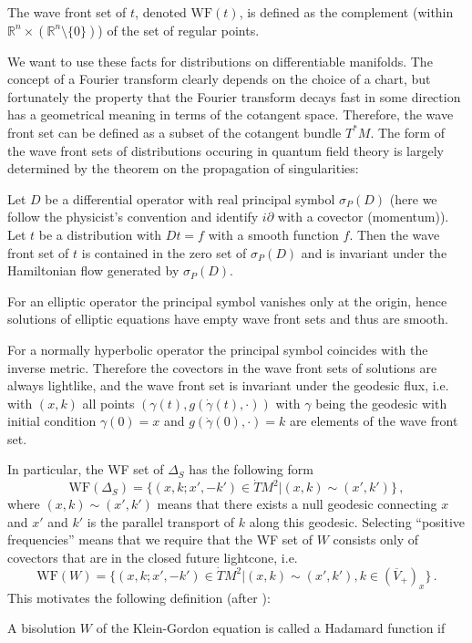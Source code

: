 \documentclass[12pt]{article}
\newcommand{\WF}{\mathrm{WF}}         %
\newcommand{\1}{\mathds{1}}                         %
\begin{document}
{{\begin{df}
The {wave front set} of $t$, denoted $\mathrm{WF}(t)$, is defined as the complement (within $\mathbb R^n\times(\mathbb R^n\setminus\{0\})$) of the set of regular points.
\end{df}}
We want to use these facts for distributions on differentiable manifolds. The concept of a Fourier transform clearly depends on the choice of a chart, but fortunately the property that  the Fourier transform decays fast  in some direction has a geometrical meaning in terms of the cotangent space. Therefore,
the wave front set can be defined as a subset of the cotangent bundle $T^*M$. The form of the wave front sets of distributions occuring in quantum field theory is largely determined by the theorem on the propagation of singularities:

{\begin{thm}
Let $D$ be a differential operator with real principal symbol $\sigma_P(D)$ (here we follow the physicist's convention and identify $i\partial$ with a covector (momentum)).
Let $t$ be a distribution with $Dt=f$ with a smooth function $f$. Then the wave front set of $t$ is contained in the zero set of $\sigma_P(D)$ and is invariant under the Hamiltonian flow generated by $\sigma_P(D)$.
\end{thm}}
\begin{itemize}
\item For an elliptic operator the principal symbol vanishes only at the origin, hence solutions of elliptic equations have empty wave front sets and thus are smooth.

{\item For a normally hyperbolic operator the principal symbol coincides with the inverse metric. Therefore the covectors in the wave front sets of solutions are always lightlike, and the wave front set is invariant under the geodesic flux, i.e. with $(x,k)$ all points $(\gamma(t),g(\dot\gamma(t),\cdot))$ with $\gamma$ being the geodesic with initial condition $\gamma(0)=x$ and $g(\dot\gamma(0),\cdot)=k$ are elements of the wave front set.}
\end{itemize}
In particular, the WF set of $\Delta_S$ has the following form
\begin{equation}\label{spectrum0}
\WF(\Delta_S)=\{(x,k;x',-k')\in \dot{T}M^2|(x,k)\sim(x',k')\}\,,
\end{equation}
where $(x,k)\sim(x',k')$ means that there exists a null geodesic connecting $x$ and $x'$ and $k'$ is the parallel transport of $k$ along this geodesic. Selecting ``positive frequencies'' means that we require that the WF set of $W$ consists only of  covectors that are in the closed future lightcone, i.e.
\begin{equation}\label{spectrum}
\WF(W)=\{(x,k;x',-k')\in \dot{T}M^2|(x,k)\sim(x',k'), k\in (\overline{V}_+)_x\}\,.
\end{equation}
This motivates the following definition (after \cite{Rad}):
\begin{df}\label{Hadamard}
A bisolution $W$ of the Klein-Gordon equation is called a Hadamard function if
\begin{enumerate}


\end{enumerate}
\end{df}}
\end{document}
